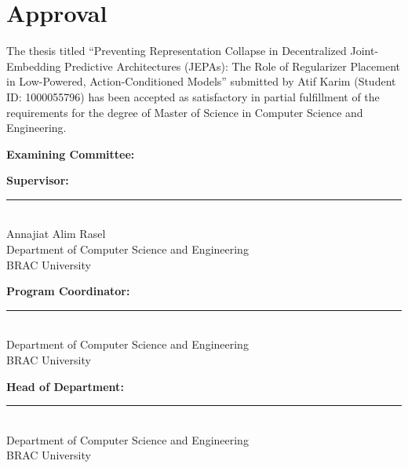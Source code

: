 \chapter*{Approval}

The thesis titled ``Preventing Representation Collapse in Decentralized
Joint-Embedding Predictive Architectures (JEPAs): The Role of Regularizer
Placement in Low-Powered, Action-Conditioned Models'' submitted by Atif Karim
(Student ID: 1000055796) has been accepted as satisfactory in partial
fulfillment of the requirements for the degree of Master of Science in
Computer Science and Engineering.

\vspace{2cm}
\noindent\textbf{Examining Committee:}

\vspace{1.5cm}
\noindent\textbf{Supervisor:}\\
\noindent\rule{6cm}{0.4pt}\\
Annajiat Alim Rasel\\
Department of Computer Science and Engineering\\
BRAC University

\vspace{1.5cm}
\noindent\textbf{Program Coordinator:}\\
\noindent\rule{6cm}{0.4pt}\\
Department of Computer Science and Engineering\\
BRAC University

\vspace{1.5cm}
\noindent\textbf{Head of Department:}\\
\noindent\rule{6cm}{0.4pt}\\
Department of Computer Science and Engineering\\
BRAC University
